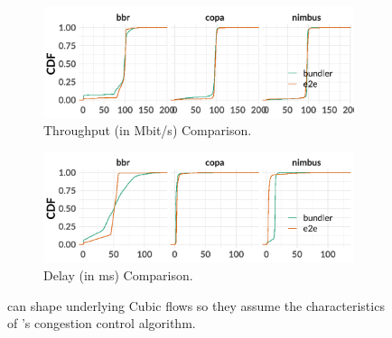 \begin{figure}
    \centering
    \begin{subfigure}[b]{0.5\textwidth}
\begin{knitrout}
\color{fgcolor}
\includegraphics[width=\maxwidth]{figure/eval_tput-delay_a-1} 

\end{knitrout}
    \caption{Throughput (in Mbit/s) Comparison.}\label{fig:eval:tputdelay:a}
    \end{subfigure}
    \begin{subfigure}[b]{0.5\textwidth}
\begin{knitrout}
\color{fgcolor}
\includegraphics[width=\maxwidth]{figure/eval_tput-delay_b-1} 

\end{knitrout}
    \caption{Delay (in ms) Comparison.}\label{fig:eval:tputdelay:b}
    \end{subfigure}

    \caption{\name can shape underlying Cubic flows so they assume the characteristics of \name's congestion control algorithm.}
    \label{fig:eval:tputdelay}
\end{figure}
